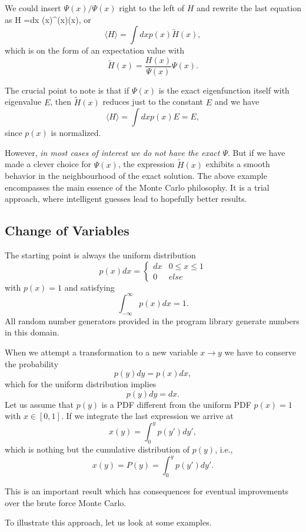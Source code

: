 We could insert $\Psi(x)/\Psi(x)$ right to the left of $H$ and rewrite
the last equation as
\be
   \langle H \rangle =\int dx  \Psi(x)^{\ast}\Psi(x)\Psi(x),
\label{eq:varqm}
 \ee
or
\[
   \langle H \rangle =\int dx  p(x)\tilde{H}(x), 
\]
which is on the form of an expectation value
with 
\[
   \tilde{H}(x)=\frac{H(x)}{\Psi(x)}\Psi(x).
\]

The crucial point to note is that if $\Psi(x)$ is the exact 
eigenfunction itself
with eigenvalue $E$, then $\tilde{H}(x)$ reduces just to the constant
$E$ and we have
\[
   \langle H \rangle =\int dx  p(x)E=E, 
\]
since $p(x)$ is normalized. 

However, {\em in most cases of interest we do not have the exact $\Psi$}.
But if we have made a clever choice for $\Psi(x)$, the expression 
$\tilde{H}(x)$ exhibits a smooth behavior in the neighbourhood of the 
exact solution. 
The above example encompasses the main essence of the Monte Carlo
philosophy. It is a trial approach, where intelligent guesses lead
to hopefully better results. 


\subsection{Change of Variables}

The starting point is always the uniform distribution
\[
p(x)dx=\left\{\begin{array}{cc} dx & 0 \le x \le 1\\
                                0  & else\end{array}\right.
\]
with $p(x)=1$ and 
satisfying
\[
  \int_{-\infty}^{\infty}p(x)dx=1.
\]
All random number generators provided in the program library 
generate numbers in this domain.

When we attempt a 
transformation to a new variable 
$x\rightarrow y$ 
we have to conserve the probability
\[
   p(y)dy=p(x)dx,
\]
which for the uniform distribution implies
\[
   p(y)dy=dx.  
\]
Let us assume that $p(y)$ is a  PDF different from the uniform
PDF $p(x)=1$ with $x \in [0,1]$.
If we integrate the last expression we arrive at
\[
   x(y)=\int_0^y p(y')dy',
\]
which is nothing but the cumulative distribution of $p(y)$, i.e.,
\[
   x(y)=P(y)=\int_0^y p(y')dy'.
\]

This is an important result which has consequences for eventual
improvements over the brute force Monte Carlo. 

To illustrate this approach, let us look at some examples.

